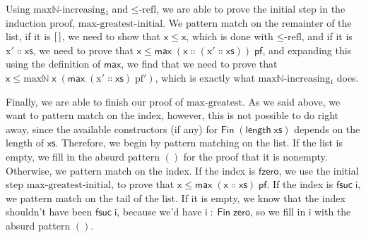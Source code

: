 \documentclass{article}
\newcommand{\Conid}[1]{\mathit{#1}}
\newcommand{\Varid}[1]{\mathit{#1}}
\def\resethooks{%
  \global\let\SaveRestoreHook\empty
  \global\let\ColumnHook\empty}
\let\hspre\empty
\let\hspost\empty
\renewcommand\Varid[1]{\mathord{\textsf{#1}}}
\let\Conid\Varid
\begin{document}
Using \ensuremath{\Varid{maxℕ-increasing₁}} and \ensuremath{\Varid{≤-refl}}, we are able to prove the initial step in the induction proof, \ensuremath{\Varid{max-greatest-initial}}. We pattern match on the remainter of the list, if it is \ensuremath{[\mskip1.5mu \mskip1.5mu]}, we need to show that \ensuremath{\Varid{x}\;\Varid{≤}\;\Varid{x}}, which is done with \ensuremath{\Varid{≤-refl}}, and if it is \ensuremath{\Varid{x′}\;\Varid{∷}\;\Varid{xs}}, we need to prove that \ensuremath{\Varid{x}\;\Varid{≤}\;\Varid{max}\;(\Varid{x}\;\Varid{∷}\;(\Varid{x′}\;\Varid{∷}\;\Varid{xs}))\;\Varid{pf}}, and expanding this using the definition of \ensuremath{\Varid{max}}, we find that we need to prove that \ensuremath{\Varid{x}\;\Varid{≤}\;\Varid{maxℕ}\;\Varid{x}\;(\Varid{max}\;(\Varid{x′}\;\Varid{∷}\;\Varid{xs})\;\Varid{pf′})}, which is exactly what \ensuremath{\Varid{maxℕ-increasing₁}} does.
\resethooks
Finally, we are able to finish our proof of \ensuremath{\Varid{max-greatest}}. As we said above, we want to pattern match on the index, however, this is not possible to do right away, since the available constructors (if any) for \ensuremath{\Conid{Fin}\;(\Varid{length}\;\Varid{xs})} depends on the length of \ensuremath{\Varid{xs}}. Therefore, we begin by pattern matching on the list. If the list is empty, we fill in the absurd pattern \ensuremath{()} for the proof that it is nonempty. Otherwise, we pattern match on the index. 
If the index is \ensuremath{\Varid{fzero}}, we use the initial step \ensuremath{\Varid{max-greatest-initial}}, to prove that \ensuremath{\Varid{x}\;\Varid{≤}\;\Varid{max}\;(\Varid{x}\;\Varid{∷}\;\Varid{xs})\;\Varid{pf}}. 
If the index is \ensuremath{\Varid{fsuc}\;\Varid{i}}, we pattern match on the tail of the list. If it is empty, we know that the index shouldn't have been \ensuremath{\Varid{fsuc}\;\Varid{i}}, because we'd have \ensuremath{\Varid{i}\;\mathbin{:}\;\Conid{Fin}\;\Varid{zero}}, so we fill in \ensuremath{\Varid{i}} with the absurd pattern \ensuremath{()}.
\end{document}

